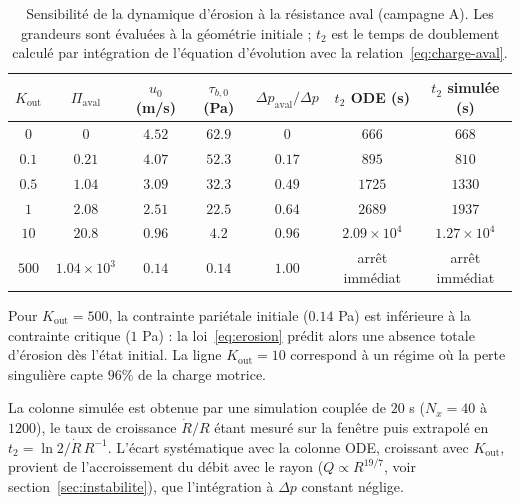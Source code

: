 \documentclass[11pt,a4paper]{report}
\newcommand{\kout}{K_{\mathrm{out}}}
\begin{document}
\begin{table}[H]
\centering
\caption{Sensibilité de la dynamique d'érosion à la résistance aval (campagne A). Les grandeurs sont
évaluées à la géométrie initiale ; \(t_2\) est le temps de doublement calculé par intégration de
l'équation d'évolution avec la relation~\eqref{eq:charge-aval}.}
\label{tab:kout}
\small
\begin{tabular}{ccccccc}
\toprule
\(\kout\) & \(\Pi_{\mathrm{aval}}\) & \(u_0\) (m/s) & \(\tau_{b,0}\) (Pa) & \(\Delta p_{\mathrm{aval}}/\Delta p\)
& \(t_2\) ODE (s) & \(t_2\) simulée (s) \\
\midrule
\(0\)    & \(0\)      & \(4.52\) & \(62.9\) & \(0\)      & \(666\) & \(668\) \\
\(0.1\)  & \(0.21\)   & \(4.07\) & \(52.3\) & \(0.17\)   & \(895\) & \(810\) \\
\(0.5\)  & \(1.04\)   & \(3.09\) & \(32.3\) & \(0.49\)   & \(1725\) & \(1330\) \\
\(1\)    & \(2.08\)   & \(2.51\) & \(22.5\) & \(0.64\)   & \(2689\) & \(1937\) \\
\(10\)   & \(20.8\)   & \(0.96\) & \(4.2\)  & \(0.96\)   & \(2.09\times10^{4}\) & \(1.27\times10^{4}\) \\
\(500\)  & \(1.04\times10^{3}\) & \(0.14\) & \(0.14\) & \(1.00\) & arrêt immédiat & arrêt immédiat \\
\bottomrule
\end{tabular}
\begin{tablenotes}
\small
\item Pour \(\kout = 500\), la contrainte pariétale initiale (\(0.14\) Pa) est inférieure à la contrainte
critique (\(1\) Pa) : la loi~\eqref{eq:erosion} prédit alors une absence totale d'érosion dès l'état
initial. La ligne \(\kout = 10\) correspond à un régime où la perte singulière capte \(96\%\) de la charge
motrice.
\item La colonne simulée est obtenue par une simulation couplée de \(20\) s (\(N_x = 40\) à
\(1200\)), le taux de croissance \(\dot R/R\) étant mesuré sur la fenêtre puis extrapolé en
\(t_2 = \ln 2/\dot R\,R^{-1}\). L'écart systématique avec la colonne ODE, croissant avec \(\kout\),
provient de l'accroissement du débit avec le rayon (\(Q \propto R^{19/7}\), voir section~\ref{sec:instabilite}),
que l'intégration à \(\Delta p\) constant néglige.
\end{tablenotes}
\end{table}
\end{document}
